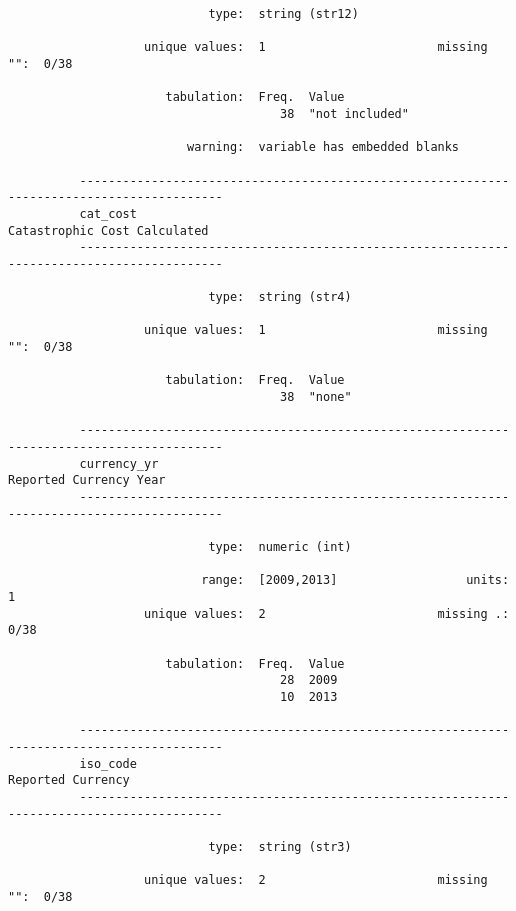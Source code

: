 \documentclass{article}
\begin{document}
\begin{verbatim}
                            type:  string (str12)
          
                   unique values:  1                        missing "":  0/38
          
                      tabulation:  Freq.  Value
                                      38  "not included"
          
                         warning:  variable has embedded blanks
          
          ------------------------------------------------------------------------------------------
          cat_cost                                                      Catastrophic Cost Calculated
          ------------------------------------------------------------------------------------------
          
                            type:  string (str4)
          
                   unique values:  1                        missing "":  0/38
          
                      tabulation:  Freq.  Value
                                      38  "none"
          
          ------------------------------------------------------------------------------------------
          currency_yr                                                         Reported Currency Year
          ------------------------------------------------------------------------------------------
          
                            type:  numeric (int)
          
                           range:  [2009,2013]                  units:  1
                   unique values:  2                        missing .:  0/38
          
                      tabulation:  Freq.  Value
                                      28  2009
                                      10  2013
          
          ------------------------------------------------------------------------------------------
          iso_code                                                                 Reported Currency
          ------------------------------------------------------------------------------------------
          
                            type:  string (str3)
          
                   unique values:  2                        missing "":  0/38
          

\end{verbatim}
\end{document}
